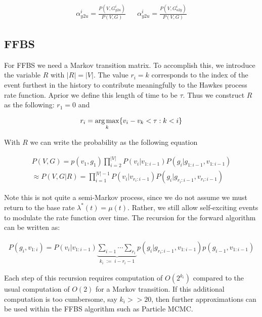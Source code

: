 \documentclass[11pt]{article}
\begin{document}
\begin{align}
  \alpha_{y2u}^i
  =
  \frac{P(V,G^{i}_{y2u})}{P(V,G)}
  &&
  \alpha_{y2u}^i
  =
  \frac{P(V,G^{i}_{u2y})}{P(V,G)}
\end{align}


\subsection{FFBS}

For FFBS we need a Markov transition matrix. To accomplish this, we introduce the variable $R$ with $|R| = |V|$. The value $r_i = k$ corresponds to the index of the event furthest in the history to contribute meaningfully to the Hawkes process rate function. Aprior we define this length of time to be $\tau$. Thus we construct $R$ as the following: $r_1 = 0$ and 

\begin{align}
  r_i = \operatorname*{arg\,max}_{k}\{ v_i - v_k < \tau : k < i\}
\end{align}

With $R$ we can write the probability as the following equation

\begin{align}
  P(V,G)
  =
  p(v_1,g_1)
  \prod_{i=2}^{|V|}P(v_{i}|v_{1:i-1})
  P(g_{i}|g_{1:i-1},v_{1:i-1})\\
  \approx
  P(V,G|R)
  =
  \prod_{i=1}^{|V|-1}P(v_{i}|v_{r_{i}:i-1})
  P(g_{i}|g_{r_{i}:i-1},v_{r_{i}:i-1})
\end{align}


Note this is not quite a semi-Markov process, since we do not assume we must return to the base rate $\lambda^*(t) = \mu(t)$. Rather, we still allow self-exciting events to modulate the rate function over time. The recursion for the forward algorithm can be written as:

\begin{align}
  P(g_i,v_{1:i})
  =
  P(v_i | v_{1:i-1}) \underbrace{\sum_{i-1}\cdots\sum_{r_i}}_{k_i\;:=\;i-r_i-1}p(g_i|g_{r_i:i-1},v_{1:i-1}) p(g_{i-1},v_{1:i-1})
\end{align}


Each step of this recursion requires computation of $O(2^{k_i})$ compared to the usual computation of $O(2)$ for a Markov transition. If this additional computation is too cumbersome, say $k_i  >> 20$, then further approximations can be used within the FFBS algorithm such as Particle MCMC. 
\end{document}
